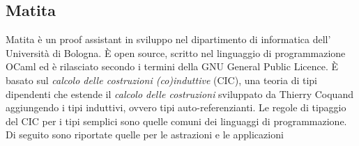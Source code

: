 \documentclass[12pt,a4paper]{report}
\begin{document}
\begin{prooftree}
\end{prooftree}

\begin{prooftree}
\end{prooftree}

\begin{prooftree}
\end{prooftree}

\begin{prooftree}
\end{prooftree}

\begin{prooftree}
\end{prooftree}


\begin{prooftree}
\end{prooftree}


\subsection{Matita}
Matita è un  proof assistant in sviluppo nel dipartimento di informatica dell'
Università di Bologna. È open source, scritto nel linguaggio di programmazione 
OCaml ed è rilasciato secondo i termini della GNU General Public Licence.
È basato sul \textit{calcolo delle costruzioni (co)induttive} (CIC), una teoria di tipi
dipendenti che estende il \textit{calcolo delle costruzioni} sviluppato da
Thierry Coquand aggiungendo i tipi induttivi, ovvero tipi auto-referenzianti.
Le regole di tipaggio del CIC per i tipi semplici sono quelle comuni dei linguaggi
di programmazione. Di seguito sono riportate quelle per le astrazioni e le applicazioni 
\end{document}
